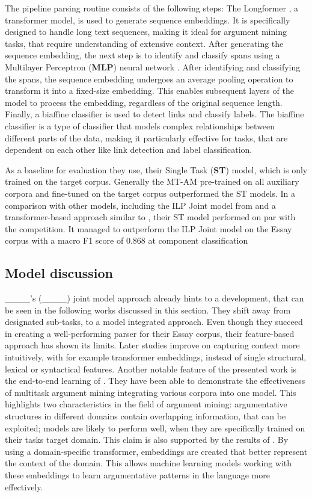 The pipeline parsing routine consists of the following steps: The Longformer \parencite{beltagy2020longformer}, a transformer model, is used to generate sequence embeddings. It is specifically designed to handle long text sequences, making it ideal for argument mining tasks, that require understanding of extensive context. After generating the sequence embedding, the next step is to identify and classify spans using a Multilayer Perceptron (\textbf{MLP}) neural network \parencite{nn_foundation}. After identifying and classifying the spans, the sequence embedding undergoes an average pooling operation to transform it into a fixed-size embedding. This enables subsequent layers of the model to process the embedding, regardless of the original sequence length. Finally, a biaffine classifier is used to detect links and classify labels. The biaffine classifier is a type of classifier that models complex relationships between different parts of the data, making it particularly effective for tasks, that are dependent on each other like link detection and label classification. 

As a baseline for evaluation they use, their Single Task (\textbf{ST}) model, which is only trained on the target corpus. Generally the MT-AM pre-trained on all auxiliary corpora and fine-tuned on the target corpus outperformed the ST models. In a comparison with other models, including the ILP Joint model from \textcite{ParsingArgumentationStructures} and a transformer-based approach similar to \textcite{TransformerHealthcareAM}, their ST model performed on par with the competition. It managed to outperform the ILP Joint model on the Essay corpus with a macro F1 score of 0.868 at component classification \parencite{mtc} 

\subsection{Model discussion}
____'s (____) joint model approach already hints to a development, that can be seen in the following works discussed in this section. They shift away from designated sub-tasks, to a model integrated approach. Even though they succeed in creating a well-performing parser for their Essay corpus, their feature-based approach has shown its limits. Later studies improve on capturing context more intuitively, with for example transformer embeddings, instead of single structural, lexical or syntactical features.  Another notable feature of the presented work is the end-to-end learning of \textcite{EndToEndAM}. They have been able to demonstrate the effectiveness of multitask argument mining integrating various corpora into one model. This highlights two characteristics in the field of argument mining: argumentative structures in different domains contain overlapping information, that can be exploited; models are likely to perform well, when they are specifically trained on their tasks target domain. This claim is also supported by the results of \textcite{TransformerHealthcareAM}. By using a domain-specific transformer, embeddings are created that better represent the context of the domain. This allows machine learning models working with these embeddings to learn argumentative patterns in the language more effectively.